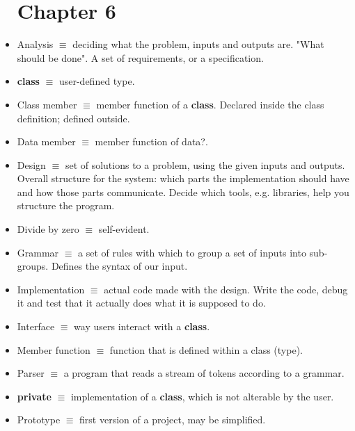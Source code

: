 \documentclass[12pt]{article}
\begin{document}
\begin{itemize}
\section*{Chapter 6}


\item Analysis $\equiv$ deciding what the problem, inputs and outputs are. "What should be done". A set of requirements, or a specification.

\item \textbf{class} $\equiv$ user-defined type.

\item Class member $\equiv$ member function of a \textbf{class}. Declared inside the class definition; defined outside.

\item Data member $\equiv$ member function of data?.

\item Design $\equiv$ set of solutions to a problem, using the given inputs and outputs. Overall structure for the system: which parts the implementation should have and how those parts communicate. Decide which tools, e.g. libraries, help you structure the program.

\item Divide by zero $\equiv$ self-evident.

\item Grammar $\equiv$ a set of rules with which to group a set of inputs into sub-groups. Defines the syntax of our input.

\item Implementation $\equiv$ actual code made with the design. Write the code, debug it and test that it actually does what it is supposed to do.

\item Interface $\equiv$ way users interact with a \textbf{class}.

\item Member function $\equiv$ function that is defined within a class (type).

\item Parser $\equiv$ a program that reads a stream of tokens according to a grammar.

\item \textbf{private} $\equiv$ implementation of a \textbf{class}, which is not alterable by the user.

\item Prototype $\equiv$ first version of a project, may be simplified.


\end{itemize}
\end{document}
